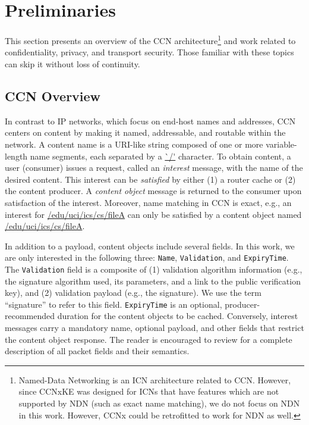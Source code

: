 \section{Preliminaries}\label{sec:prelims}
This section presents an overview of the CCN architecture\footnote{Named-Data Networking \cite{jacobson2009networking}
is an ICN architecture related to CCN. However, since CCNxKE was
designed for ICNs that have features which are not supported by NDN (such
as exact name matching), we do not focus on NDN in this work. However,
CCNx could be retrofitted to work for NDN as well.} and work
related to confidentiality, privacy, and transport security. Those familiar with these topics
can skip it without loss of continuity.

\subsection{CCN Overview}
In contrast to IP networks, which focus on end-host names and addresses,
CCN \cite{jacobson2009networking,mosko2016semantics} centers
on content by making it named, addressable, and routable within the network. A
content name is a URI-like string composed of one or more
variable-length name segments, each separated by a \url{`/'} character. To
obtain content, a user (consumer) issues a request, called an \emph{interest}
message, with the name of the desired content. This interest can be
\emph{satisfied} by either (1) a router cache or (2) the content producer. A
\emph{content object} message is returned to the consumer upon satisfaction of
the interest. Moreover, name matching in CCN is exact, e.g., an interest for
\url{/edu/uci/ics/cs/fileA} can only be satisfied by a content object
named \url{/edu/uci/ics/cs/fileA}.

In addition to a payload, content objects include several fields. In this work,
we are only interested in the following three: {\tt Name}, {\tt Validation}, and {\tt ExpiryTime}.
The {\tt Validation} field is a composite of (1) validation algorithm information
(e.g., the signature algorithm used, its parameters, and a link to the public
verification key), and (2) validation payload (e.g., the signature). We use the
term ``signature'' to refer to this field. {\tt ExpiryTime} is an optional,
producer-recommended duration for the content objects to be cached.
Conversely, interest messages carry a mandatory name, optional payload, and
other fields that restrict the content object response. The reader is encouraged
to review \cite{mosko2016semantics} for a complete description of all packet fields
and their semantics.

